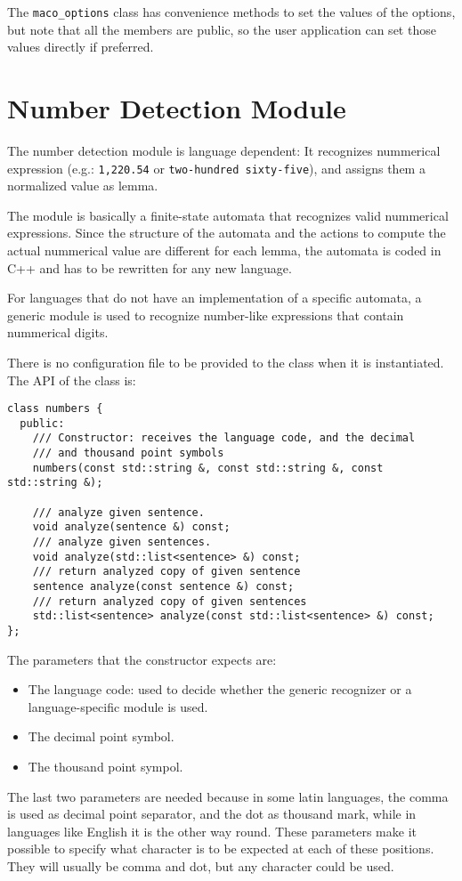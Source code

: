 \documentclass[a4paper]{book}
\begin{document}
  The {\tt maco\_options} class has convenience methods to set the
  values of the options, but note that all the members are public, so
  the user application can set those values directly if preferred.

\section{Number Detection Module}
\label{file-numb}

  The number detection module is language dependent: It recognizes
  nummerical expression (e.g.: {\tt 1,220.54} or {\tt two-hundred
    sixty-five}), and assigns them a normalized value as lemma.

  The module is basically a finite-state automata that recognizes
  valid nummerical expressions. Since the structure of the automata
  and the actions to compute the actual nummerical value are different
  for each lemma, the automata is coded in C++ and has to be rewritten 
  for any new language.

   For languages that do not have an implementation of a specific
   automata, a generic module is used to recognize number-like
   expressions that contain nummerical digits.

   There is no configuration file to be provided to the class when it
   is instantiated. The API of the class is:
\begin{verbatim}  
class numbers {
  public:
    /// Constructor: receives the language code, and the decimal 
    /// and thousand point symbols
    numbers(const std::string &, const std::string &, const std::string &); 

    /// analyze given sentence.
    void analyze(sentence &) const;
    /// analyze given sentences.
    void analyze(std::list<sentence> &) const;
    /// return analyzed copy of given sentence
    sentence analyze(const sentence &) const;
    /// return analyzed copy of given sentences
    std::list<sentence> analyze(const std::list<sentence> &) const;
};
\end{verbatim}  

   The parameters that the constructor expects are: 
\begin{itemize}
\item The language code: used to decide whether the generic recognizer
  or a language-specific module is used.
\item The decimal point symbol.
\item The thousand point sympol.
\end{itemize}
  The last two parameters are needed because in some latin languages,
  the comma is used as decimal point separator, and the dot as
  thousand mark, while in languages like English it is the other way
  round.  These parameters make it possible to specify what character
  is to be expected at each of these positions. They will usually be
  comma and dot, but any character could be used.
\end{document}
